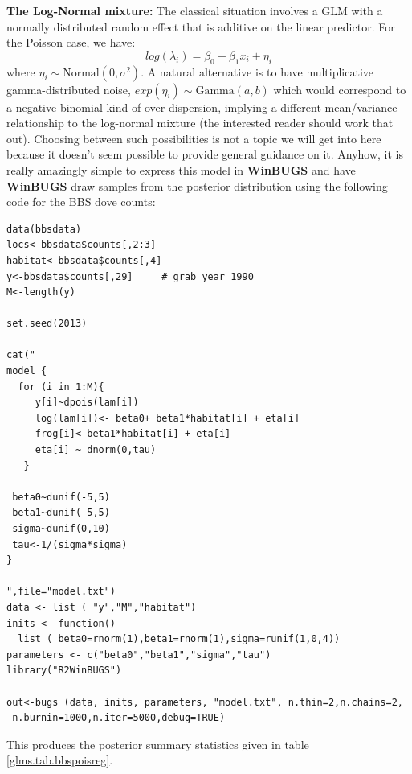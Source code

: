 {\bf The Log-Normal mixture:} The classical situation involves a GLM
with a normally distributed random effect that is additive on the
linear predictor. For the Poisson case, we have:
\[
 	log(\lambda_{i}) = \beta_0  + \beta_1 x_{i} + \eta_{i}
\]
where $\eta_{i} \sim \mbox{Normal}(0,\sigma^{2})$.  A natural
alternative is to have multiplicative gamma-distributed noise,
$exp(\eta_{i}) \sim \mbox{Gamma}(a,b)$ which would correspond to a
negative binomial kind of over-dispersion, implying a different
mean/variance relationship to the log-normal mixture (the interested
reader should work that out).  Choosing between such possibilities is
not a topic we will get into here because it doesn't seem possible to
provide general guidance on it.   
 Anyhow, it is really amazingly simple to
express this model in {\bf WinBUGS} and have {\bf WinBUGS} draw
samples from the posterior distribution using the following code for
the BBS dove counts: 
{\small
\begin{verbatim}
data(bbsdata)
locs<-bbsdata$counts[,2:3]
habitat<-bbsdata$counts[,4]
y<-bbsdata$counts[,29]     # grab year 1990
M<-length(y)

set.seed(2013)

cat("
model {
  for (i in 1:M){
     y[i]~dpois(lam[i])
     log(lam[i])<- beta0+ beta1*habitat[i] + eta[i]
     frog[i]<-beta1*habitat[i] + eta[i]
     eta[i] ~ dnorm(0,tau)
   }

 beta0~dunif(-5,5)
 beta1~dunif(-5,5)
 sigma~dunif(0,10)
 tau<-1/(sigma*sigma)
}

",file="model.txt")
data <- list ( "y","M","habitat")
inits <- function()
  list ( beta0=rnorm(1),beta1=rnorm(1),sigma=runif(1,0,4))
parameters <- c("beta0","beta1","sigma","tau")
library("R2WinBUGS")

out<-bugs (data, inits, parameters, "model.txt", n.thin=2,n.chains=2,
 n.burnin=1000,n.iter=5000,debug=TRUE)
\end{verbatim}
}

This produces the posterior summary statistics given in table \ref{glms.tab.bbspoisreg}. 


